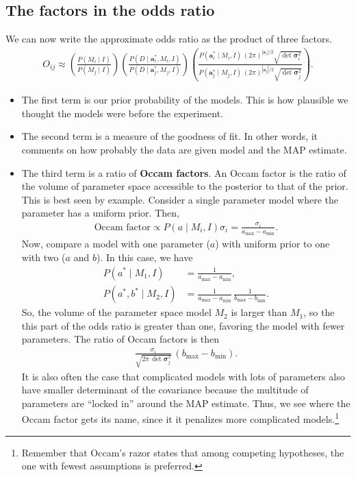 \subsection{The factors in the odds ratio}
We can now write the approximate odds ratio as the product of three
factors.
\begin{align}
O_{ij} \approx \left(\frac{P(M_i\mid I)}{P(M_j\mid I)}\right)
\left(\frac{P(D\mid \mathbf{a}_i^*, M_i, I)}{P(D\mid \mathbf{a}_j^*, M_j, I)}\right)
\left(\frac{P(\mathbf{a}_i^*\mid M_i, I)\,\left(2\pi\right)^{|\mathbf{a}_i|/2}\sqrt{\det\boldsymbol{\sigma}_i^2}}
{P(\mathbf{a}_j^*\mid M_j, I)\,\left(2\pi\right)^{|\mathbf{a}_j|/2}\sqrt{\det\boldsymbol{\sigma}_j^2}}\right).
\end{align}
\begin{itemize}
\item The first term is our prior probability of the models.  This is
  how plausible we thought the models were before the experiment.
\item The second term is a measure of the goodness of fit.  In other
  words, it comments on how probably the data are given model and the
  MAP estimate.
\item The third term is a ratio of \textbf{Occam factors}.  An Occam
  factor is the ratio of the volume of parameter space accessible to
  the posterior to that of the prior.  This is best seen by example.
  Consider a single parameter model where the parameter has a uniform
  prior.  Then,
  \begin{align}
    \text{Occam factor} \propto P(a\mid M_i, I) \sigma_i = \frac{\sigma_i}{a_\mathrm{max} - a_\mathrm{min}}.
  \end{align}
  Now, compare a model with one parameter ($a$) with uniform prior to
  one with two ($a$ and $b$).  In this case, we have
  \begin{align}
    P(a^*\mid M_1,I) &= \frac{1}{a_\mathrm{max} - a_\mathrm{min}}, \\
    P(a^*, b^*\mid M_2,I) &= \frac{1}{a_\mathrm{max} - a_\mathrm{min}}\,
                            \frac{1}{b_\mathrm{max} - b_\mathrm{min}}.
  \end{align}
  So, the volume of the parameter space model $M_2$ is larger than
  $M_1$, so the this part of the odds ratio is greater than one,
  favoring the model with fewer parameters.  The ratio of Occam
  factors is then
  \begin{align}
    \frac{\sigma_i}{\sqrt{2\pi \,\det \boldsymbol{\sigma}_j^2}}\, (b_\mathrm{max} - b_\mathrm{min}).
  \end{align}
  It is also often the case that complicated models with lots of
  parameters also have smaller determinant of the covariance because
  the multitude of parameters are ``locked in'' around the MAP
  estimate.  Thus, we see where the Occam factor gets its name, since
  it it penalizes more complicated models.\footnote{Remember that
    Occam's razor states that among competing hypotheses, the one with
    fewest assumptions is preferred.}
\end{itemize}

